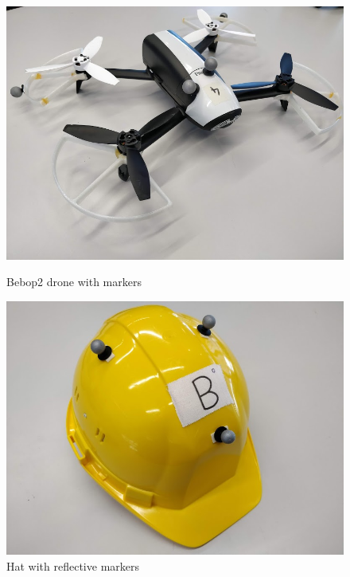 \begin{figure}
	\centering
	\begin{minipage}{.31\textwidth}
		\centering
		\includegraphics[width=.95\linewidth]{Figures/bebop}
		\caption{Bebop2 drone with markers}
		\label{fig::bebop}
	\end{minipage}%
	\begin{minipage}{.31\textwidth}
		\centering
		\includegraphics[width=.95\linewidth]{Figures/hat}
		\caption{Hat with reflective markers}
		\label{fig::hat}
	\end{minipage}%
	\begin{minipage}{.31\textwidth}
		\centering

\end{minipage}
\end{figure}
